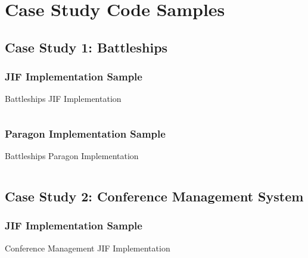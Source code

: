 \chapter{Case Study Code Samples}

\clearpage

\section{Case Study 1: Battleships}

\subsection{JIF Implementation Sample} \label{appendix_bs_jif}

\begin{listing}[!ht]
	\caption{Battleships JIF Implementation}
	\label{lst_appendix_bs_jif}
\end{listing}

\inputminted{java}{content/code_sections/case_studies/bs_printout.jif}

\clearpage

\subsection{Paragon Implementation Sample} \label{appendix_bs_para}

\begin{listing}[!ht]
	\caption{Battleships Paragon Implementation}
	\label{lst_appendix_bs_para}
\end{listing}


\inputminted{java}{content/code_sections/case_studies/bs_printout.para}

\clearpage

\section{Case Study 2: Conference Management System}

\subsection{JIF Implementation Sample} \label{appendix_conf_jif}

\begin{listing}[!ht]
	\caption{Conference Management JIF Implementation}
	\label{lst_appendix_conf_jif}
\end{listing}

